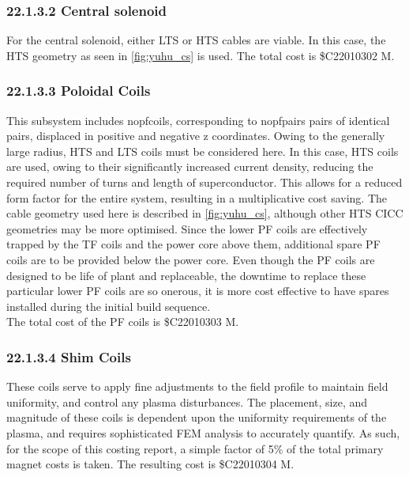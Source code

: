 \subsubsection*{22.1.3.2 Central solenoid}

For the central solenoid, either LTS or HTS cables are viable. In this case, the HTS geometry as seen in \ref{fig:yuhu_cs} is used. The total cost is \$C22010302 M.

\subsubsection*{22.1.3.3 Poloidal Coils}

This subsystem includes nopfcoils, corresponding to nopfpairs pairs of identical pairs, displaced in positive and negative z coordinates. Owing to the generally large radius, HTS and LTS coils must be considered here. In this case, HTS coils are used, owing to their significantly increased current density, reducing the required number of turns and length of superconductor. This allows for a reduced form factor for the entire system, resulting in a multiplicative cost saving. The cable geometry used here is described in \ref{fig:yuhu_cs}, although other HTS CICC geometries may be more optimised.
Since the lower PF coils are effectively trapped by the TF coils and the power core above them, additional spare PF coils are to be provided below the power core. Even though the PF coils are designed to be life of plant and replaceable, the downtime to replace these particular lower PF coils are so onerous, it is more cost effective to have spares installed during the initial build sequence.  \\

The total cost of the PF coils is \$C22010303 M.

\subsubsection*{22.1.3.4 Shim Coils}

These coils serve to apply fine adjustments to the field profile to maintain field uniformity, and control any plasma disturbances. The placement, size, and magnitude of these coils is dependent upon the uniformity requirements of the plasma, and requires sophisticated FEM analysis to accurately quantify. As such, for the scope of this costing report, a simple factor of 5\% of the total primary magnet costs is taken. The resulting cost is \$C22010304 M.

